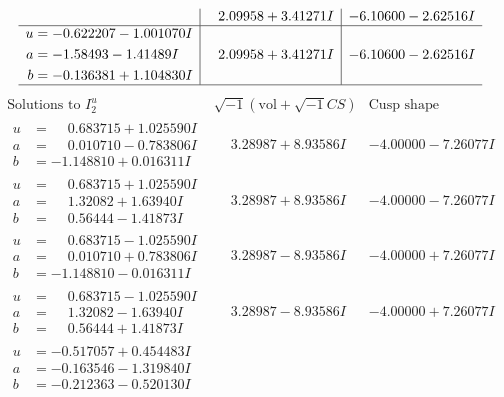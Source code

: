 \documentclass[1p]{elsarticle_modified}
\theoremstyle{definition}
\newcommand{\I}{\sqrt{-1}}
\begin{document}
$$\begin{array}{c|c|c}
 & \phantom{-}2.09958 + 3.41271 I & -6.10600 - 2.62516 I \\ \hline\begin{aligned}
u &= -0.622207 - 1.001070 I \\
a &= -1.58493 - 1.41489 I \\
b &= -0.136381 + 1.104830 I\end{aligned}
 & \phantom{-}2.09958 + 3.41271 I & -6.10600 - 2.62516 I\\
 \hline 
 \end{array}$$\newpage$$\begin{array}{c|c|c}  
\text{Solutions to }I^u_{2}& \I (\text{vol} + \sqrt{-1}CS) & \text{Cusp shape}\\
 \hline 
\begin{aligned}
u &= \phantom{-}0.683715 + 1.025590 I \\
a &= \phantom{-}0.010710 - 0.783806 I \\
b &= -1.148810 + 0.016311 I\end{aligned}
 & \phantom{-}3.28987 + 8.93586 I & -4.00000 - 7.26077 I \\ \hline\begin{aligned}
u &= \phantom{-}0.683715 + 1.025590 I \\
a &= \phantom{-}1.32082 + 1.63940 I \\
b &= \phantom{-}0.56444 - 1.41873 I\end{aligned}
 & \phantom{-}3.28987 + 8.93586 I & -4.00000 - 7.26077 I \\ \hline\begin{aligned}
u &= \phantom{-}0.683715 - 1.025590 I \\
a &= \phantom{-}0.010710 + 0.783806 I \\
b &= -1.148810 - 0.016311 I\end{aligned}
 & \phantom{-}3.28987 - 8.93586 I & -4.00000 + 7.26077 I \\ \hline\begin{aligned}
u &= \phantom{-}0.683715 - 1.025590 I \\
a &= \phantom{-}1.32082 - 1.63940 I \\
b &= \phantom{-}0.56444 + 1.41873 I\end{aligned}
 & \phantom{-}3.28987 - 8.93586 I & -4.00000 + 7.26077 I \\ \hline\begin{aligned}
u &= -0.517057 + 0.454483 I \\
a &= -0.163546 - 1.319840 I \\
b &= -0.212363 - 0.520130 I\end{aligned}

\end{array}$$
\end{document}
